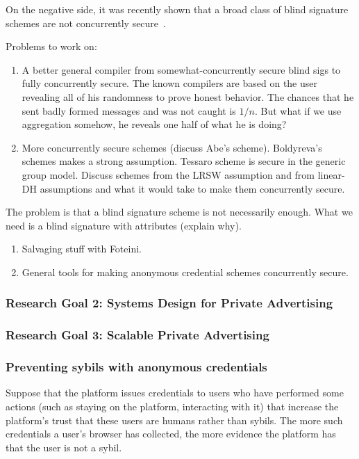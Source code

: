 On the negative side, it was recently shown that a broad class of blind signature schemes are not concurrently secure~\cite{}.

Problems to work on:

\begin{enumerate}
\item A better general compiler from somewhat-concurrently secure blind sigs to fully concurrently secure.  The known compilers are based on the user revealing all of his randomness to prove honest behavior.  The chances that he sent badly formed messages and was not caught is $1/n$.  But what if we use aggregation somehow, he reveals one half of what he is doing?  


\item More concurrently secure schemes (discuss Abe's scheme).  Boldyreva's schemes makes a strong assumption.  Tessaro scheme is secure in the generic group model.  Discuss schemes from the LRSW assumption and from linear-DH assumptions and what it would take to make them concurrently secure.  
\end{enumerate}

The problem is that a blind signature scheme is not necessarily enough.  What we need is a blind signature with attributes (explain why). 

\begin{enumerate}
\item Salvaging stuff with Foteini.
\item General tools for making anonymous credential schemes concurrently secure.  
\end{enumerate}

\subsubsection{Research Goal 2: Systems Design for Private Advertising}

\subsubsection{Research Goal 3: Scalable Private Advertising}

\subsubsection{Preventing sybils with anonymous credentials} 
%
Suppose that the platform issues credentials to users who have performed some actions (such as staying on the platform, interacting with it) that increase the platform's trust that these users are humans rather than sybils.  
%
The more such credentials a user's browser has collected, the more evidence the platform has that the user is not a sybil.  

